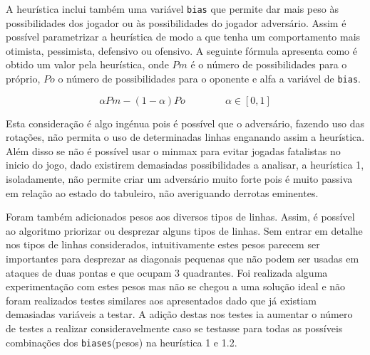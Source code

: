 A heurística inclui também uma variável \verb|bias| que permite dar mais peso às possibilidades dos jogador ou às possibilidades do jogador adversário. Assim é possível parametrizar a heurística de modo a que tenha um comportamento mais otimista, pessimista, defensivo ou ofensivo. A seguinte fórmula apresenta como é obtido um valor pela heurística, onde $Pm$ é o número de possibilidades para o próprio, $Po$ o número de possibilidades para o oponente e alfa a variável de \verb|bias|.

\begin{equation}
\alpha Pm-(1-\alpha)Po  \qquad\qquad\alpha\in[0,1] 
\end{equation}

Esta consideração é algo ingénua pois é possível que o adversário, fazendo uso das rotações, não permita o uso de determinadas linhas enganando assim a heurística. Além disso se não é possível usar o minmax para evitar jogadas fatalistas no inicio do jogo, dado existirem demasiadas possibilidades a analisar, a heurística 1, isoladamente, não permite criar um adversário muito forte pois é muito passiva em relação ao estado do tabuleiro, não averiguando derrotas eminentes.

Foram também adicionados pesos aos diversos tipos de linhas. Assim, é possível ao algoritmo priorizar ou desprezar alguns tipos de linhas. Sem entrar em detalhe nos tipos de linhas considerados, intuitivamente estes pesos parecem ser importantes para desprezar as diagonais pequenas que não podem ser usadas em ataques de duas pontas e que ocupam 3 quadrantes. Foi realizada alguma experimentação com estes pesos mas não se chegou a uma solução ideal e não foram realizados testes similares aos apresentados dado que já existiam demasiadas variáveis a testar. A adição destas nos testes ia aumentar o número de testes a realizar consideravelmente caso se testasse para todas as possíveis combinações dos \verb|biases|(pesos) na heurística 1 e 1.2.

